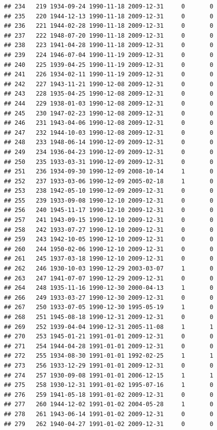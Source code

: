 \documentclass[
]{book}
\begin{document}
\begin{verbatim}
## 234   219 1934-09-24 1990-11-18 2009-12-31     0       0
## 235   220 1944-12-13 1990-11-18 2009-12-31     0       0
## 236   221 1944-02-28 1990-11-18 2009-12-31     0       0
## 237   222 1948-07-20 1990-11-18 2009-12-31     0       0
## 238   223 1941-04-28 1990-11-18 2009-12-31     0       0
## 239   224 1946-07-04 1990-11-19 2009-12-31     0       0
## 240   225 1939-04-25 1990-11-19 2009-12-31     0       0
## 241   226 1934-02-11 1990-11-19 2009-12-31     0       0
## 242   227 1943-11-21 1990-12-08 2009-12-31     0       0
## 243   228 1935-04-25 1990-12-08 2009-12-31     0       0
## 244   229 1938-01-03 1990-12-08 2009-12-31     0       0
## 245   230 1947-02-23 1990-12-08 2009-12-31     0       0
## 246   231 1943-04-06 1990-12-08 2009-12-31     0       0
## 247   232 1944-10-03 1990-12-08 2009-12-31     0       0
## 248   233 1948-06-14 1990-12-09 2009-12-31     0       0
## 249   234 1936-04-23 1990-12-09 2009-12-31     0       0
## 250   235 1933-03-31 1990-12-09 2009-12-31     0       0
## 251   236 1934-09-30 1990-12-09 2008-10-14     1       0
## 252   237 1933-03-06 1990-12-09 2005-02-18     1       0
## 253   238 1942-05-10 1990-12-09 2009-12-31     0       0
## 255   239 1933-09-08 1990-12-10 2009-12-31     0       0
## 256   240 1945-11-17 1990-12-10 2009-12-31     0       0
## 257   241 1943-09-15 1990-12-10 2009-12-31     0       0
## 258   242 1933-07-27 1990-12-10 2009-12-31     0       0
## 259   243 1942-10-05 1990-12-10 2009-12-31     0       0
## 260   244 1950-02-06 1990-12-10 2009-12-31     0       0
## 261   245 1937-03-18 1990-12-10 2009-12-31     0       0
## 262   246 1930-10-03 1990-12-29 2003-03-07     1       0
## 263   247 1941-07-07 1990-12-29 2009-12-31     0       0
## 264   248 1935-11-16 1990-12-30 2000-04-13     1       0
## 266   249 1933-03-27 1990-12-30 2009-12-31     0       0
## 267   250 1933-07-05 1990-12-30 1995-05-19     1       0
## 268   251 1945-08-18 1990-12-31 2009-12-31     0       0
## 269   252 1939-04-04 1990-12-31 2005-11-08     1       1
## 270   253 1945-01-21 1991-01-01 2009-12-31     0       0
## 271   254 1944-04-28 1991-01-01 2009-12-31     0       0
## 272   255 1934-08-30 1991-01-01 1992-02-25     1       1
## 273   256 1933-12-29 1991-01-01 2009-12-31     0       0
## 274   257 1930-09-08 1991-01-01 2006-12-15     1       1
## 275   258 1930-12-31 1991-01-02 1995-07-16     1       0
## 276   259 1941-05-18 1991-01-02 2009-12-31     0       0
## 277   260 1944-12-02 1991-01-02 2004-05-28     1       0
## 278   261 1943-06-14 1991-01-02 2009-12-31     0       0
## 279   262 1940-04-27 1991-01-02 2009-12-31     0       0

\end{verbatim}
\end{document}
